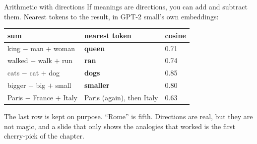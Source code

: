 \documentclass[aspectratio=169]{beamer}
\newcommand{\watchbox}[1]{%
  \begin{tcolorbox}[colback=armorange!12, colframe=armorange, boxrule=0.6pt, arc=2pt]
  #1
  \end{tcolorbox}}
\begin{document}
\begin{frame}{Arithmetic with directions}
  \vspace{0.5em}
  If meanings are directions, you can add and subtract them. Nearest tokens to the result, in
  GPT-2 small's own embeddings:

  \vspace{0.6em}
  \begin{center}
  \small
  \begin{tabular}{@{}lll@{}}
    \toprule
    \textbf{sum} & \textbf{nearest token} & \textbf{cosine}\\
    \midrule
    king $-$ man $+$ woman & \textbf{queen} & 0.71\\
    walked $-$ walk $+$ run & \textbf{ran} & 0.74\\
    cats $-$ cat $+$ dog & \textbf{dogs} & 0.85\\
    bigger $-$ big $+$ small & \textbf{smaller} & 0.80\\
    \midrule
    Paris $-$ France $+$ Italy & \textcolor{armred}{Paris} (again), then Italy & 0.63\\
    \bottomrule
  \end{tabular}
  \end{center}

  \vspace{0.6em}
  \watchbox{\small The last row is kept on purpose. ``Rome'' is fifth. Directions are real, but
  they are not magic, and a slide that only shows the analogies that worked is the first
  cherry-pick of the chapter.}
\end{frame}
\end{document}
